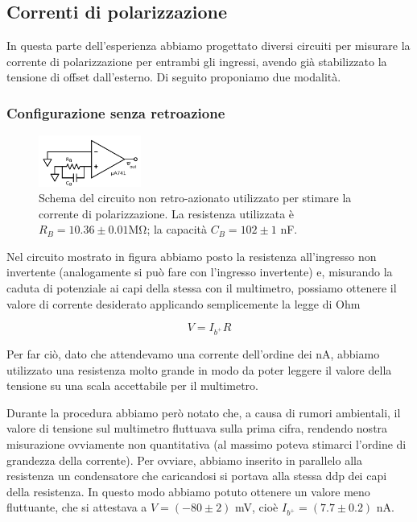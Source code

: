 \subsection{Correnti di polarizzazione}

In questa parte dell'esperienza abbiamo progettato diversi circuiti per misurare la corrente di polarizzazione per entrambi gli ingressi, avendo già stabilizzato la tensione di offset dall'esterno. Di seguito proponiamo due modalità.

\subsubsection{Configurazione senza retroazione}

\begin{figure}
  \begin{center}
    \includegraphics[width=0.30\textwidth]{../E02/latex/direct_measure.pdf}
  \end{center}
  \caption{Schema del circuito non retro-azionato utilizzato per stimare la corrente di polarizzazione. La resistenza utilizzata è $R_B=10.36\pm0.01$\si{\mega\ohm}; la capacità $C_B=102 \pm 1$ \si{\nano\farad}.}
  \label{circuito:rel2_correnti_senzaretroazione}
\end{figure}

Nel circuito mostrato in figura abbiamo posto la resistenza all'ingresso non invertente (analogamente si può fare con l'ingresso invertente) e, misurando la caduta di potenziale ai capi della stessa con il multimetro, possiamo ottenere il valore di corrente desiderato applicando semplicemente la legge di Ohm

$$V=I_{b^+} R$$

Per far ciò, dato che attendevamo una corrente dell'ordine dei \si{\nano\ampere}, abbiamo utilizzato una resistenza molto grande in modo da poter leggere il valore della tensione su una scala accettabile per il multimetro.

Durante la procedura abbiamo però notato che, a causa di rumori ambientali, il valore di tensione sul multimetro fluttuava sulla prima cifra, rendendo nostra misurazione ovviamente non quantitativa (al massimo poteva stimarci l'ordine di grandezza della corrente). Per ovviare, abbiamo inserito in parallelo alla resistenza un condensatore che caricandosi si portava alla stessa ddp dei capi della resistenza. In questo modo abbiamo potuto ottenere un valore meno fluttuante, che si attestava a $V=(-80 \pm 2)$ \si{\milli\volt}, cioè $I_{b^+}=(7.7 \pm 0.2)$ \si{\nano\ampere}.

